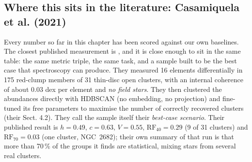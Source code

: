 \subsection{Where this sits in the literature: Casamiquela et al. (2021)}
\label{sec:literature}

Every number so far in this chapter has been scored against our own baselines.
The closest published measurement is \citet{Casamiquela:21}, and it is close
enough to sit in the same table: the same metric triple, the same task, and a
sample built to be the best case that spectroscopy can produce. They measured
16 elements differentially in 175 red-clump members of 31 thin-disc open
clusters, with an internal coherence of about $0.03$ dex per element and
\emph{no field stars}. They then clustered the abundances directly with HDBSCAN
(no embedding, no projection) and fine-tuned its free parameters to maximise
the number of correctly recovered clusters (their Sect. 4.2). They call the
sample itself their \emph{best-case scenario}. Their published result is $h =
0.49$, $c = 0.63$, $V = 0.55$, $\mathrm{RF}_{40} = 0.29$ (9 of 31 clusters) and
$\mathrm{RF}_{70} = 0.03$ (one cluster, NGC~2682); their own summary of that
run is that more than 70\,\% of the groups it finds are statistical, mixing
stars from several real clusters.

